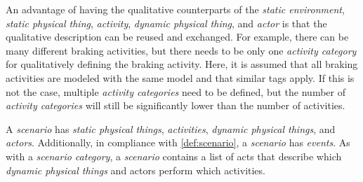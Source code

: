 An advantage of having the qualitative counterparts of the \textit{static environment}, \cstartb \textit{static physical thing}\cendb, \textit{activity}, \cstartb \textit{dynamic physical thing}, \cendb and \textit{actor} is that the qualitative description can be reused and exchanged. For example, there can be many different braking activities, but there needs to be only one \textit{activity category} for qualitatively defining the braking activity. Here, it is assumed that all braking activities are modeled with the same model and that similar tags apply. If this is not the case, multiple \textit{activity categories} need to be defined, but the number of \textit{activity categories} will still be significantly lower than the number of activities.

A \textit{scenario} has \cstartc\textit{static physical things}\cendc, \textit{activities}, \cstartb \textit{dynamic physical things}, \cendb and \textit{actors}. 
Additionally, in compliance with \cref{def:scenario}, a \textit{scenario} has \textit{events}. 
As with a \textit{scenario category}, a \textit{scenario} contains a list of acts that describe which \cstartb \textit{dynamic physical things} and \cendb actors perform which activities.
